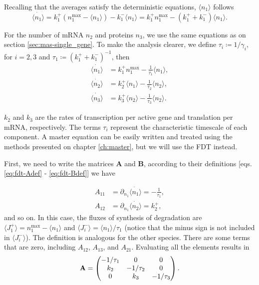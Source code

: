 Recalling that the averages satisfy the deterministic equations, $\langle n_1\rangle$ follows
\begin{equation*}
  \dot{\langle n_1\rangle} = k_1^+(n_1^\text{max}-\langle n_1\rangle) - k_1^-\langle n_1\rangle = k_1^+n_1^\text{max} - (k_1^++k_1^-)\langle n_1\rangle.
\end{equation*}

For the number of mRNA $n_2$ and proteins $n_3$, we use the same equations as on section \ref{sec:mas-single_gene}. To make the analysis clearer, we define $\tau_i\coloneqq 1/\gamma_i$, for $i=2,3$ and $\tau_1\coloneqq (k_1^++k_1^-)^{-1}$, then
\begin{equation}
  \begin{split}
    \dot{\langle n_1\rangle} &= k_1^+n_1^\text{max} - \frac{1}{\tau_1}\langle n_1\rangle,\\
    \dot{\langle n_2\rangle} &= k_2^+\langle n_1\rangle - \frac{1}{\tau_2}\langle n_2\rangle,\\
    \dot{\langle n_3\rangle} &= k_3^+\langle n_2\rangle - \frac{1}{\tau_3}\langle n_2\rangle.
  \end{split}
\end{equation}

$k_2$ and $k_3$ are the rates of transcription per active gene and translation per mRNA, respectively. The terms $\tau_i$ represent the characteristic timescale of each component. A master equation can be easily written and treated using the methods presented on chapter \ref{ch:master}, but we will use the FDT instead.

First, we need to write the matrices $\mathbf{A}$ and $\mathbf{B}$, according to their definitions [eqs. \eqref{eq:fdt-Adef} - \eqref{eq:fdt-Bdef}] we have

\begin{equation*}
  \begin{split}
    A_{11} &= \partial_{n_1}\dot{\langle n_1\rangle} =-\frac{1}{\tau_1},\\
    A_{12} &= \partial_{n_1}\dot{\langle n_2\rangle} = k_2^+,
  \end{split}
\end{equation*}
and so on. In this case, the fluxes of synthesis of degradation are $\langle J_1^+\rangle = n_1^\text{max}-\langle n_1\rangle$ and $\langle J_i^-\rangle = \langle n_1\rangle/\tau_1$ (notice that the minus sign is not included in $\langle J_i^-\rangle$). The definition is analogous for the other species. There are some terms that are zero, including $A_{12}$, $A_{13}$, and $A_{21}$. Evaluating all the elements results in
\begin{equation}
  \label{eq:fdt-A}
  \mathbf{A} = \begin{pmatrix}
    -1/\tau_1 & 0 & 0 \\
    k_2 & -1/\tau_2 & 0 \\
    0 & k_3 & -1/\tau_3
  \end{pmatrix}.\\
\end{equation}

